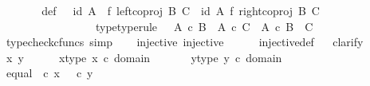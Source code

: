 \begin{isabellebody}
%
\isadelimproof
%
\endisadelimproof
%
\isatagproof
{}\isamarkupfalse%
\ {\isacharminus}{\kern0pt}\isanewline
\ \ \isamarkupfalse%
\ {\isasymphi}\ \ {\isasymphi}{\isacharunderscore}{\kern0pt}def{\isacharcolon}{\kern0pt}\ {\isachardoublequoteopen}{\isasymphi}\ {\isacharequal}{\kern0pt}\ {\isacharparenleft}{\kern0pt}id\ A\ \ {\isasymtimes}\isactrlsub f\ left{\isacharunderscore}{\kern0pt}coproj\ B\ C{\isacharparenright}{\kern0pt}\ {\isasymamalg}\ {\isacharparenleft}{\kern0pt}id\ A\ {\isasymtimes}\isactrlsub f\ right{\isacharunderscore}{\kern0pt}coproj\ B\ C{\isacharparenright}{\kern0pt}{\isachardoublequoteclose}\ \isanewline
\ \ \ \ \ \ \ \ \ \ \ \ \ \ \ \ \ {\isasymphi}{\isacharunderscore}{\kern0pt}type{\isacharbrackleft}{\kern0pt}type{\isacharunderscore}{\kern0pt}rule{\isacharbrackright}{\kern0pt}{\isacharcolon}{\kern0pt}\ {\isachardoublequoteopen}{\isasymphi}\ {\isacharcolon}{\kern0pt}\ {\isacharparenleft}{\kern0pt}A\ {\isasymtimes}\isactrlsub c\ B{\isacharparenright}{\kern0pt}\ {\isasymCoprod}\ {\isacharparenleft}{\kern0pt}A\ {\isasymtimes}\isactrlsub c\ C{\isacharparenright}{\kern0pt}\ {\isasymrightarrow}\ A\ {\isasymtimes}\isactrlsub c\ {\isacharparenleft}{\kern0pt}B\ {\isasymCoprod}\ C{\isacharparenright}{\kern0pt}{\isachardoublequoteclose}\isanewline
\ \ \ \ \isamarkupfalse%
\ {\isacharparenleft}{\kern0pt}typecheck{\isacharunderscore}{\kern0pt}cfuncs{\isacharcomma}{\kern0pt}\ simp{\isacharparenright}{\kern0pt}\isanewline
\isanewline
\ \ \isamarkupfalse%
\ injective{\isacharcolon}{\kern0pt}\ {\isachardoublequoteopen}injective{\isacharparenleft}{\kern0pt}{\isasymphi}{\isacharparenright}{\kern0pt}{\isachardoublequoteclose}\isanewline
\ \ \ \ \isamarkupfalse%
\ injective{\isacharunderscore}{\kern0pt}def\isanewline
\ \ \isamarkupfalse%
{\isacharparenleft}{\kern0pt}clarify{\isacharparenright}{\kern0pt}\ \isanewline
\ \ \ \ \isamarkupfalse%
\ x\ y\isanewline
\ \ \ \ \isamarkupfalse%
\ x{\isacharunderscore}{\kern0pt}type{\isacharcolon}{\kern0pt}\ {\isachardoublequoteopen}x\ {\isasymin}\isactrlsub c\ domain\ {\isasymphi}{\isachardoublequoteclose}\isanewline
\ \ \ \ \isamarkupfalse%
\ y{\isacharunderscore}{\kern0pt}type{\isacharcolon}{\kern0pt}\ {\isachardoublequoteopen}y\ {\isasymin}\isactrlsub c\ domain\ {\isasymphi}{\isachardoublequoteclose}\isanewline
\ \ \ \ \isamarkupfalse%
\ equal{\isacharcolon}{\kern0pt}\ {\isachardoublequoteopen}{\isasymphi}\ {\isasymcirc}\isactrlsub c\ x\ {\isacharequal}{\kern0pt}\ {\isasymphi}\ {\isasymcirc}\isactrlsub c\ y{\isachardoublequoteclose}\isanewline

\end{isabellebody}
